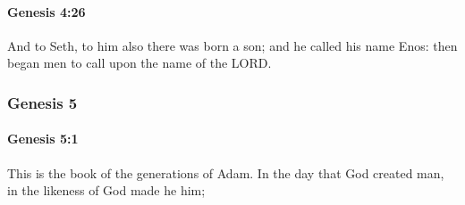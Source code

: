 		\paragraph{Genesis 4:26} %
			\label{GENESIS-4-26}

			And to Seth, to him also there was born a son; and he called his name Enos: then began men to call upon the name of the LORD.

	\subsubsection{Genesis 5} %
		\label{GENESIS-5}

		\paragraph{Genesis 5:1} %
			\label{GENESIS-5-1}

			This is the book of the generations of Adam. In the day that God created man, in the likeness of God made he him;


